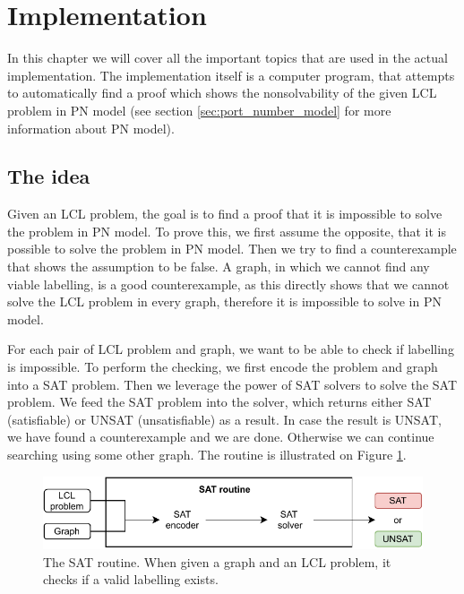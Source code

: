 
\section{Implementation} \label{sec:implementation}
In this chapter we will cover all the important topics that are used in the actual implementation.
The implementation itself is a computer program, that attempts to automatically find a proof which shows the nonsolvability of the given LCL problem in PN model (see section \ref{sec:port_number_model} for more information about PN model).

\subsection{The idea}
Given an LCL problem, the goal is to find a proof that it is impossible to solve the problem in PN model.
To prove this, we first assume the opposite, that it is possible to solve the problem in PN model.
Then we try to find a counterexample that shows the assumption to be false.
A graph, in which we cannot find any viable labelling, is a good counterexample, as this directly shows that we cannot solve the LCL problem in every graph, therefore it is impossible to solve in PN model.

For each pair of LCL problem and graph, we want to be able to check if labelling is impossible.
To perform the checking, we first encode the problem and graph into a SAT problem.
Then we leverage the power of SAT solvers to solve the SAT problem.
We feed the SAT problem into the solver, which returns either SAT (satisfiable) or UNSAT (unsatisfiable) as a result.
In case the result is UNSAT, we have found a counterexample and we are done.
Otherwise we can continue searching using some other graph.
The routine is illustrated on Figure \ref{fig:implementatio:idea:1}.

\begin{figure}[H]
\centering
\includegraphics[]{diagrams/implementation_idea_diagram2.pdf}
\caption{The SAT routine. When given a graph and an LCL problem, it checks if a valid labelling exists.}
\label{fig:implementatio:idea:1}
\end{figure}

